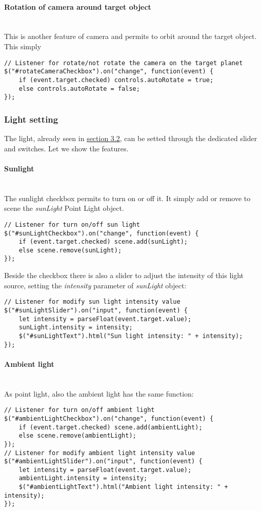 \documentclass{article}
\begin{document}
\paragraph{Rotation of camera around target object}\mbox{}\\
This is another feature of camera and permits to orbit around the target object. This simply 
\begin{lstlisting}
// Listener for rotate/not rotate the camera on the target planet
$("#rotateCameraCheckbox").on("change", function(event) {
	if (event.target.checked) controls.autoRotate = true;
	else controls.autoRotate = false;
});
\end{lstlisting}

\subsubsection{Light setting}
The light, already seen in \hyperref[light:section]{section 3.2}, can be setted through the dedicated slider and switches. Let we show the features.
\paragraph{Sunlight} \mbox{}\\
The sunlight checkbox permits to turn on or off it. It simply add or remove to scene the \textit{sunLight} Point Light object.
\begin{lstlisting}
// Listener for turn on/off sun light
$("#sunLightCheckbox").on("change", function(event) {
	if (event.target.checked) scene.add(sunLight);
	else scene.remove(sunLight);
});
\end{lstlisting}
Beside the checkbox there is also a slider to adjust the intensity of this light source, setting the \textit{intensity} parameter of \textit{sunLight} object:
\begin{lstlisting}
// Listener for modify sun light intensity value
$("#sunLightSlider").on("input", function(event) {
	let intensity = parseFloat(event.target.value);
	sunLight.intensity = intensity;
	$("#sunLightText").html("Sun light intensity: " + intensity);
});
\end{lstlisting}
\paragraph{Ambient light}\mbox{}\\
As point light, also the ambient light has the same function:
\begin{lstlisting}
// Listener for turn on/off ambient light
$("#ambientLightCheckbox").on("change", function(event) {
	if (event.target.checked) scene.add(ambientLight);
	else scene.remove(ambientLight);
});
// Listener for modify ambient light intensity value
$("#ambientLightSlider").on("input", function(event) {
	let intensity = parseFloat(event.target.value);
	ambientLight.intensity = intensity;
	$("#ambientLightText").html("Ambient light intensity: " + intensity);
});
\end{lstlisting}
\end{document}
